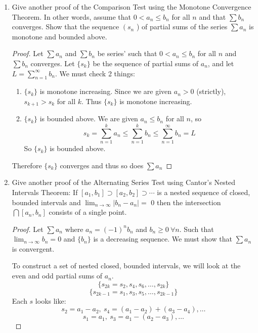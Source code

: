 \documentclass[hidelinks,12pt]{article}
\title{\scalebox{2}{Math 524 Homework 2}}
\author{\scalebox{1.5}{Theo Koss}}
\date{Feburary 2024}
\renewcommand{\geq}{\geqslant}
\renewcommand{\leq}{\leqslant}
\begin{document}
\maketitle
\begin{enumerate}
\item Give another proof of the Comparison Test using the Monotone Convergence Theorem. In other words, assume that $0<a_n \leq b_n$ for all $n$ and that $\sum b_n$ converges. Show that the sequence $\left(s_n\right.$ ) of partial sums of the series $\sum a_n$ is monotone and bounded above.
    \begin{proof}[Proof]
        Let $\sum a_n$ and $\sum b_n$ be series' such that $0<a_n\leq b_n$ for all $n$ and $\sum b_n$ converges. Let $\{s_k\}$ be the sequence of partial sums of $a_n$, and let $L=\sum_{n=1}^{\infty} b_n$. We must check 2 things: \begin{enumerate}
            \item $\{s_k\}$ is monotone increasing. Since we are given $a_n>0$ (strictly), $s_{k+1}>s_k$ for all $k$. Thus $\{s_k\}$ is monotone increasing.
            \item $\{s_k\}$ is bounded above. We are given $a_n\leq b_n$ for all $n$, so \[s_k=\sum_{n=1}^k a_n\leq\sum_{n=1}^k b_n\leq\sum_{n=1}^{\infty} b_n=L\]
                So $\{s_k\}$ is bounded above.
        \end{enumerate}
        Therefore $\{s_k\}$ converges and thus so does $\sum a_n$ 
    \end{proof}
\item Give another proof of the Alternating Series Test using Cantor's Nested Intervals Theorem: If $\left[a_1, b_1\right] \supset\left[a_2, b_2\right] \supset \cdots$ is a nested sequence of closed, bounded intervals and $\lim _{n \rightarrow \infty}\left|b_n-a_n\right|=$ 0 then the intersection $\bigcap\left[a_n, b_n\right]$ consists of a single point.
\begin{proof}[Proof]
    Let $\sum a_n$ where $a_n=(-1)^nb_n$ and $b_n\geq0\ \forall n$. Such that $\lim_{n\to\infty}b_n=0$ and $\{b_n\}$ is a decreasing sequence. We must show that $\sum a_n$ is convergent.
    \par\null\par
    To construct a set of nested closed, bounded intervals, we will look at the even and odd partial sums of $a_n$. 
    \[\{s_{2k}=s_2,s_4,s_6,\dots,s_{2k}\}\]
    \[\{s_{2k-1}=s_1,s_3,s_5,\dots,s_{2k-1}\}\]
    Each $s$ looks like:
    \[s_2=a_1-a_2,\ s_4=(a_1-a_2)+(a_3-a_4),\dots\]
    \[s_1=a_1,\ s_3=a_1-(a_2-a_3),\dots\]

\end{proof}
\end{enumerate}
\end{document}
